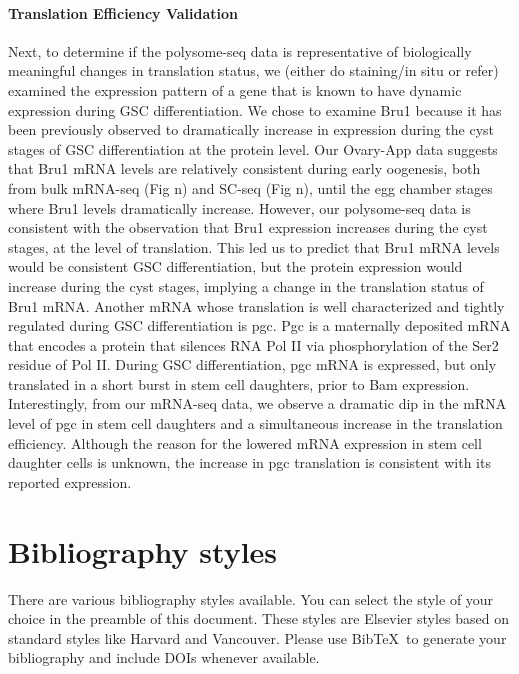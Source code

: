 \documentclass[]{elsarticle} %
\begin{document}
\hypertarget{translation-efficiency-validation}{%
\paragraph{Translation Efficiency
Validation}\label{translation-efficiency-validation}}

\hfill\break

Next, to determine if the polysome-seq data is representative of
biologically meaningful changes in translation status, we (either do
staining/in situ or refer) examined the expression pattern of a gene
that is known to have dynamic expression during GSC differentiation. We
chose to examine Bru1 because it has been previously observed to
dramatically increase in expression during the cyst stages of GSC
differentiation at the protein level. Our Ovary-App data suggests that
Bru1 mRNA levels are relatively consistent during early oogenesis, both
from bulk mRNA-seq (Fig n) and SC-seq (Fig n), until the egg chamber
stages where Bru1 levels dramatically increase. However, our
polysome-seq data is consistent with the observation that Bru1
expression increases during the cyst stages, at the level of
translation. This led us to predict that Bru1 mRNA levels would be
consistent GSC differentiation, but the protein expression would
increase during the cyst stages, implying a change in the translation
status of Bru1 mRNA. Another mRNA whose translation is well
characterized and tightly regulated during GSC differentiation is pgc.
Pgc is a maternally deposited mRNA that encodes a protein that silences
RNA Pol II via phosphorylation of the Ser2 residue of Pol II. During GSC
differentiation, pgc mRNA is expressed, but only translated in a short
burst in stem cell daughters, prior to Bam expression. Interestingly,
from our mRNA-seq data, we observe a dramatic dip in the mRNA level of
pgc in stem cell daughters and a simultaneous increase in the
translation efficiency. Although the reason for the lowered mRNA
expression in stem cell daughter cells is unknown, the increase in pgc
translation is consistent with its reported expression.

\hypertarget{bibliography-styles}{%
\section{Bibliography styles}\label{bibliography-styles}}

There are various bibliography styles available. You can select the
style of your choice in the preamble of this document. These styles are
Elsevier styles based on standard styles like Harvard and Vancouver.
Please use BibTeX~to generate your bibliography and include DOIs
whenever available.
\end{document}
